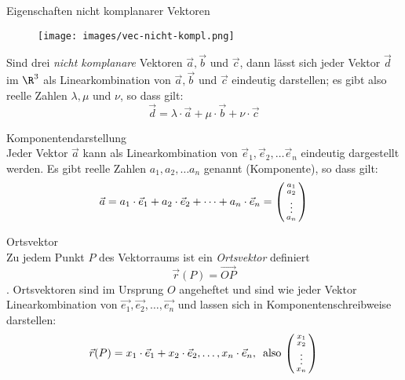 \begin{theorem}{Eigenschaften nicht komplanarer Vektoren}\\
    \begin{wrapfigure}{r}{0.2\linewidth}
        \vspace{-10pt}
        \texttt{[image: images/vec-nicht-kompl.png]}
    \end{wrapfigure}
    Sind drei \textit{nicht komplanare} Vektoren $\vec{a}, \vec{b}$ und $\vec{c}$,
    dann lässt sich jeder Vektor $\vec{d}$ im $\R^3$ als Linearkombination von $\vec{a},\vec{b}$ und $\vec{c}$
    eindeutig darstellen;
    es gibt also reelle Zahlen $\lambda, \mu$ und $\nu$, so dass gilt:
    \begin{equation*}
        \vec{d}=\lambda\cdot\vec{a}+\mu\cdot\vec{b}+\nu\cdot\vec{c}
    \end{equation*}
\end{theorem}

\begin{definition}{Komponentendarstellung}\\
    Jeder Vektor $\vec{a}$ kann als Linearkombination von $\vec{e}_1, \vec{e}_2,\ldots\vec{e}_n$
    eindeutig dargestellt werden. 
    Es gibt reelle Zahlen $a_1, a_2, \ldots a_n$ genannt (Komponente), so dass gilt:
    \begin{equation*}
        \vec{a}=a_1\cdot\vec{e}_1+a_2\cdot\vec{e}_2+\cdots+a_n\cdot\vec{e}_n=
        \begin{psmallmatrix}
            a_1\\a_2\\\vdots\\a_n
        \end{psmallmatrix}
    \end{equation*}
\end{definition}

\begin{definition}{Ortsvektor}\\
    Zu jedem Punkt $P$ des Vektorraums ist ein \textit{Ortsvektor} definiert
    \begin{equation*}
        \vec{r}(P)=\overrightarrow{OP}
    \end{equation*}.
    Ortsvektoren sind im Ursprung $O$ angeheftet und sind wie jeder Vektor Linearkombination 
    von $\vec{e_1}, \vec{e_2},\ldots, \vec{e_n}$ und lassen sich in Komponentenschreibweise darstellen:
    \begin{equation*}
        \vec{r}(P)=x_1\cdot\vec{e}_1+x_2\cdot\vec{e}_2,\ldots,x_n\cdot\vec{e}_n,\, \text{ also }
        \begin{psmallmatrix}
            x_1\\x_2\\\vdots\\x_n
        \end{psmallmatrix}
    \end{equation*}
\end{definition}

